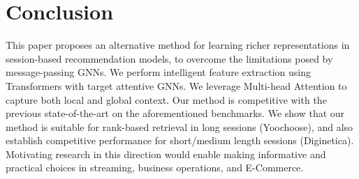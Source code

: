 \documentclass[conference]{IEEEtran}
\begin{document}
\section{Conclusion}
This paper proposes an alternative method for learning richer representations in session-based recommendation models, to overcome the limitations posed by message-passing GNNs. We perform intelligent feature extraction using Transformers with target attentive GNNs. We leverage Multi-head Attention to capture both local and global context. Our method is competitive with the previous state-of-the-art on the aforementioned benchmarks. We show that our method is suitable for rank-based retrieval in long sessions (Yoochoose), and also establish competitive performance for short/medium length sessions (Diginetica). Motivating research in this direction would enable making informative and practical choices in streaming, business operations, and E-Commerce.




\end{document}
